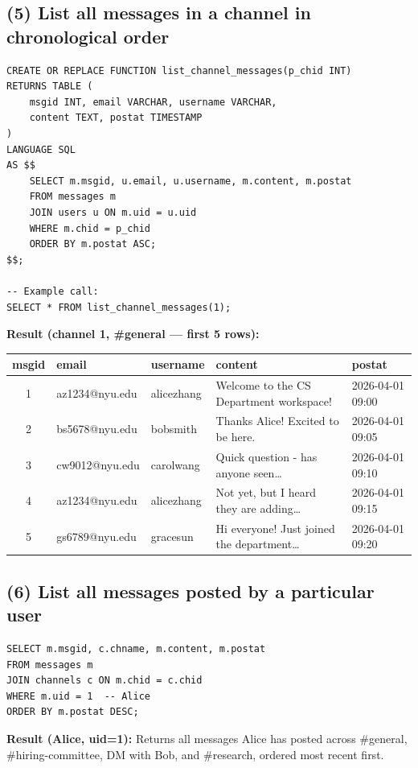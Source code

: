\documentclass[11pt]{article}
\begin{document}
\subsection{(5) List all messages in a channel in chronological order}

\begin{lstlisting}
CREATE OR REPLACE FUNCTION list_channel_messages(p_chid INT)
RETURNS TABLE (
    msgid INT, email VARCHAR, username VARCHAR,
    content TEXT, postat TIMESTAMP
)
LANGUAGE SQL
AS $$
    SELECT m.msgid, u.email, u.username, m.content, m.postat
    FROM messages m
    JOIN users u ON m.uid = u.uid
    WHERE m.chid = p_chid
    ORDER BY m.postat ASC;
$$;

-- Example call:
SELECT * FROM list_channel_messages(1);
\end{lstlisting}

\noindent\textbf{Result (channel 1, \#general --- first 5 rows):}
\begin{center}
\tiny
\begin{tabular}{cllll}
\toprule
msgid & email & username & content & postat \\
\midrule
1 & az1234@nyu.edu & alicezhang & Welcome to the CS Department workspace! & 2026-04-01 09:00 \\
2 & bs5678@nyu.edu & bobsmith & Thanks Alice! Excited to be here. & 2026-04-01 09:05 \\
3 & cw9012@nyu.edu & carolwang & Quick question - has anyone seen\ldots & 2026-04-01 09:10 \\
4 & az1234@nyu.edu & alicezhang & Not yet, but I heard they are adding\ldots & 2026-04-01 09:15 \\
5 & gs6789@nyu.edu & gracesun & Hi everyone! Just joined the department\ldots & 2026-04-01 09:20 \\
\bottomrule
\end{tabular}
\end{center}

\newpage
\subsection{(6) List all messages posted by a particular user}

\begin{lstlisting}
SELECT m.msgid, c.chname, m.content, m.postat
FROM messages m
JOIN channels c ON m.chid = c.chid
WHERE m.uid = 1  -- Alice
ORDER BY m.postat DESC;
\end{lstlisting}

\noindent\textbf{Result (Alice, uid=1):} Returns all messages Alice has posted across \#general, \#hiring-committee, DM with Bob, and \#research, ordered most recent first.
\end{document}
